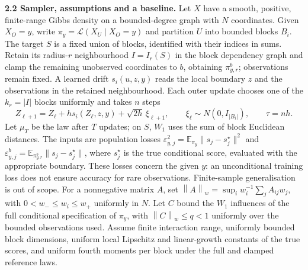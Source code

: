 \documentclass[12pt,a4paper]{article}
\newcommand{\E}{\mathbb E}
\newcommand{\W}{W_1}
\newcommand{\piy}{\pi_y}
\newcommand{\pir}{\pi_{y,r}^{b}}
\newcommand{\normw}[1]{\left\|#1\right\|_w}
\begin{document}
\textbf{2.2 Sampler, assumptions and a baseline.}
Let $X$ have a smooth, positive, finite-range Gibbs density on a bounded-degree graph with $N$ coordinates. Given $X_O=y$, write $\piy=\mathcal L(X_U\mid X_O=y)$ and partition $U$ into bounded blocks $B_i$. The target $S$ is a fixed union of blocks, identified with their indices in sums. Retain its radius-$r$ neighbourhood $I=I_r(S)$ in the block dependency graph and clamp the remaining unobserved coordinates to $b$, obtaining $\pir$; observations remain fixed. A learned drift $s_i(u,z,y)$ reads the local boundary $z$ and the observations in the retained neighbourhood. Each outer update chooses one of the $k_r=|I|$ blocks uniformly and takes $n$ steps
\begin{equation}\label{eq:update}
 Z_{\ell+1}=Z_\ell+h s_i(Z_\ell,z,y)+\sqrt{2h}\,\xi_{\ell+1},
 \qquad \xi_\ell\sim N(0,I_{|B_i|}),\qquad \tau=nh.
\end{equation}
Let $\mu_T$ be the law after $T$ updates; on $S$, $\W$ uses the sum of block Euclidean distances. The inputs are population losses $\varepsilon_{y,j}^2=\E_{\piy}\|s_j-s_j^\star\|^2$ and $\varepsilon^b_{y,j}=\E_{\pir}\|s_j-s_j^\star\|$, where $s_j^\star$ is the true conditional score, evaluated with the appropriate boundary. These losses concern the given $y$: an unconditional training loss does not ensure accuracy for rare observations. Finite-sample generalisation is out of scope.
For a nonnegative matrix $A$, set $\normw{A}=\sup_i w_i^{-1}\sum_j A_{ij}w_j$, with $0<w_-\leq w_i\leq w_+$ uniformly in $N$. Let $C$ bound the $\W$ influences of the full conditional specification of $\piy$, with $\normw{C}\leq q<1$ uniformly over the bounded observations used. Assume finite interaction range, uniformly bounded block dimensions, uniform local Lipschitz and linear-growth constants of the true scores, and uniform fourth moments per block under the full and clamped reference laws.
\end{document}
